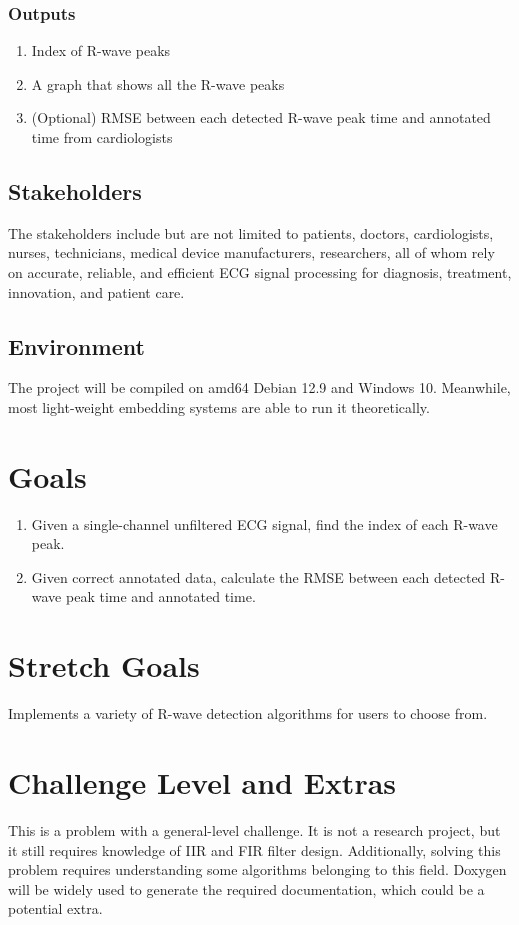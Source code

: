 \documentclass{article}
\begin{document}
\subsubsection{Outputs}

\begin{enumerate}
    \item Index of R-wave peaks
    \item A graph that shows all the R-wave peaks
    \item (Optional) RMSE between each detected R-wave peak time and annotated time from cardiologists
\end{enumerate}

\subsection{Stakeholders}

The stakeholders include but are not limited to patients, doctors, cardiologists, nurses, technicians, medical device manufacturers, researchers, all of whom rely on accurate, reliable, and efficient ECG signal processing for diagnosis, treatment, innovation, and patient care.

\subsection{Environment}

The project will be compiled on amd64 Debian 12.9 and Windows 10. Meanwhile, most light-weight embedding systems are able to run it theoretically.

\section{Goals}

\begin{enumerate}
    \item Given a single-channel unfiltered ECG signal, find the index of each R-wave peak.
    \item Given correct annotated data, calculate the RMSE between each detected R-wave peak time and annotated time.
\end{enumerate}

\section{Stretch Goals}

Implements a variety of R-wave detection algorithms for users to choose from.

\section{Challenge Level and Extras}

This is a problem with a general-level challenge. It is not a research project, but it still requires knowledge of IIR and FIR filter design. Additionally, solving this problem requires understanding some algorithms belonging to this field. Doxygen will be widely used to generate the required documentation, which could be a potential extra.
\end{document}
